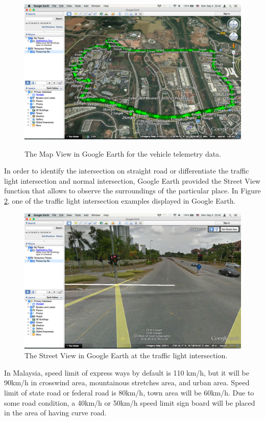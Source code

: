 \begin{figure}[hbt!]\centering
\includegraphics[width=.75\textwidth]{image/GEMapView}
\label{fig:GEMap}
\caption{The Map View in Google Earth for the vehicle telemetry data.}
\end{figure}

In order to identify the intersection on straight road or differentiate the traffic light intersection and normal intersection, Google Earth provided the Street View function that allows to observe the surroundings of the particular place. In Figure \ref{fig:GEStreet}, one of the traffic light intersection examples displayed in Google Earth. 

\begin{figure}[hbt!]\centering
\includegraphics[width=.75\textwidth]{image/GEStreetView}
\caption{The Street View in Google Earth at the traffic light intersection.}
\label{fig:GEStreet}
\end{figure}

In Malaysia, speed limit of express ways by default is 110 km/h, but it will be 90km/h in crosswind area, mountainous stretches area, and urban area. Speed limit of state road or federal road is 80km/h, town area will be 60km/h. Due to some road condition, a 40km/h or 50km/h speed limit sign board will be placed in the area of having curve road. 

